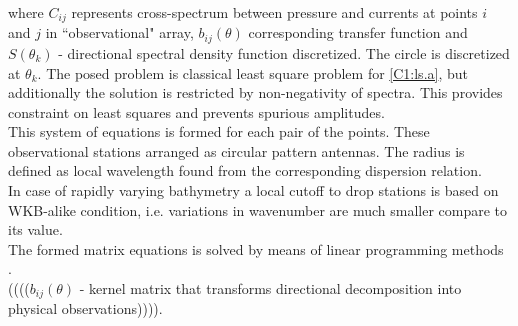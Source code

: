 where $C_{ij}$ represents cross-spectrum between pressure and currents at points $i$ and $j$ in ``observational" array, $b_{ij}(\theta)$ corresponding transfer function and $S(\theta_k)$ - directional spectral density function discretized. The circle is discretized at $\theta_k$. The posed problem is classical least square problem for \eqref{C1:ls.a}, but additionally the solution is restricted by non-negativity of spectra. This provides constraint on least squares and prevents spurious amplitudes.\\
This system of equations is formed for each pair of the points. These observational stations arranged as circular pattern antennas. The radius is defined as local wavelength found from the corresponding dispersion relation.\\
In case of rapidly varying bathymetry a local cutoff to drop stations is based on WKB-alike condition, i.e. variations in wavenumber are much smaller compare to its value.\\
The formed matrix equations is solved by means of linear programming methods \cite{haskell1981algorithm}.\\
\small{(((($b_{ij}(\theta)$ - kernel matrix that transforms directional decomposition into physical observations)))).}\\

